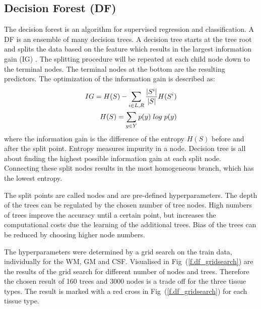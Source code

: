 \documentclass[journal]{IEEEtran}
\begin{document}
\subsection{Decision Forest (DF)}
The decision forest is an algorithm for supervised regression and classification. A DF is an ensemble of many decision trees. A decision tree starts at the tree root and splits the data based on the feature which results in the largest information gain (IG) . The splitting procedure will be repeated at each child node down to the terminal nodes. The terminal nodes at the bottom are the resulting predictors. The optimization of the information gain is described as:
\begin{equation}
	\begin{split}
		IG = H(S) -\sum_{i \in {L,R}} \frac{ \vert S ^i \vert}{\vert S \vert} H(S^i) \\
		H(S) = \sum_{y \in Y} p(y) \hspace{0.1 cm} log \hspace{0.1 cm}  p(y)\\
	\end{split}
\end{equation}
where the information gain is the difference of the entropy $H(S)$ before and after the split point. Entropy measures impurity in a node. Decision tree is all about finding the highest possible information gain at each split node. Connecting these split nodes results in the most homogeneous branch, which has the lowest entropy.

The split points are called nodes and are pre-defined hyperparameters. The depth of the trees can be regulated by the chosen number of tree nodes. High numbers of trees improve the accuracy until a certain point, but increases the computational costs due the learning of the additional trees. Bias of the trees can be reduced by choosing higher node numbers.

The hyperparameters were determined by a grid search on the train data, individually for the WM, GM and CSF. Visualised in Fig~(\ref{f.df_gridsearch}) are the results of the grid search for different number of nodes and trees. Therefore the chosen result of 160 trees and 3000 nodes is a trade off for the three tissue types. The result is marked with a red cross in Fig~(\ref{f.df_gridsearch})  for each tissue type.
\end{document}
